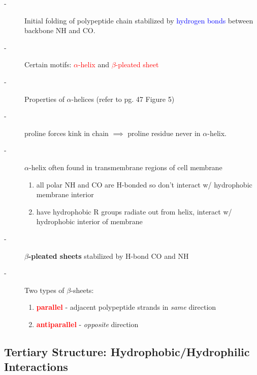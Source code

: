 \documentclass[10pt,a4paper]{report}
\begin{document}
	\begin{description}
		\item[-] Initial folding of polypeptide chain stabilized by \textcolor{blue}{hydrogen bonds} between backbone NH and CO.
		\item[-] Certain motifs: \textcolor{red}{$\alpha$-helix} and \textcolor{red}{$\beta$-pleated sheet}
		\item[-] Properties of $\alpha$-helices (refer to pg. 47 Figure 5) \\
		\item[-] proline forces kink in chain $\implies$ proline residue never in $\alpha$-helix.
		\item[-] $\alpha$-helix often found in transmembrane regions of cell membrane
		\begin{enumerate}
			\item all polar NH and CO are H-bonded so don't interact w/ hydrophobic membrane interior
			\item have hydrophobic R groups radiate out from helix, interact w/ hydrophobic interior of membrane
		\end{enumerate}
		
		\item[-] \textbf{$\beta$-pleated sheets} stabilized by H-bond CO and NH
		\item[-] Two types of $\beta$-sheets:
		\begin{enumerate}
			\item \textcolor{red}{\textbf{parallel}} - adjacent polypeptide strands in \textit{same} direction
			\item \textcolor{red}{\textbf{antiparallel}} - \textit{opposite} direction
		\end{enumerate}	
	\end{description}
	
	\subsection{Tertiary Structure: Hydrophobic/Hydrophilic Interactions}
	
\end{document}
